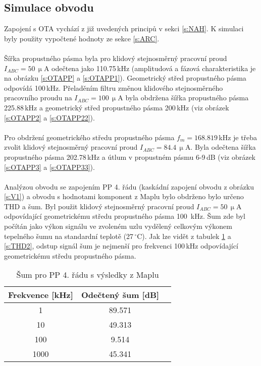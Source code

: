 \subsection{Simulace obvodu}
\noindent  Zapojení s OTA vychází z již uvedených principů v sekci \ref{s:NAH}. K simulaci byly použity vypočtené hodnoty ze sekce \ref{s:ARC}. \\
\\
Šířka propustného pásma byla pro klidový stejnosměrný pracovní proud $I_{ABC} = 50$\,$\upmu$A odečtena jako 110.75\,kHz (amplitudová a fázová charakteristika je na obrázku \ref{s:OTAPP} a \ref{s:OTAPP1}). Geometrický střed propustného pásma odpovídá 100\,kHz. Přeladěním filtru změnou klidového stejnosměrného pracovního proudu na $I_{ABC} = 100$\,$\upmu$A byla obdržena šířka propustného pásma 225.88\,kHz a geometrický střed propustného pásma 200\,kHz (viz obrázek \ref{s:OTAPP2} a \ref{s:OTAPP22}). \\
\\
Pro obdržení geometrického středu propustného pásma $f_m = 168.819$\,kHz je třeba zvolit klidový stejnosměrný pracovní proud $I_{ABC} = 84.4$\,$\upmu$A. Byla odečtena šířka propustného pásma 202.78\,kHz a útlum v propustném pásmu 6-9\,dB (viz obrázek \ref{s:OTAPP3} a \ref{s:OTAPP33}). \\
\\
Analýzou obvodu se zapojením PP 4. řádu (kaskádní zapojení obvodu z obrázku \ref{s:V1}) a obvodu s hodnotami komponent z Maplu bylo obdrženo bylo určeno THD a šum. Byl použit klidový stejnosměrný pracovní proud $I_{ABC} = 50$\,$\upmu$A odpovídající geometrickému středu propustného pásma 100~kHz. Šum zde byl počítán jako výkon signálu ve zvoleném uzlu vydělený celkovým výkonem tepelného šumu na standardní teplotě (27\,$^{\circ}$C). Jak lze vidět z tabulek \ref{s:THD1} a \ref{s:THD2}, odstup signál šum je nejmenší pro frekvenci 100\,kHz odpovídající geometrickému středu propustného pásma.
\begin{table}[h]
\centering
  \begin{tabular}{ | c | c | c |}
    \hline
     Frekvence [kHz] & Odečtený šum [dB] \\ \hline
    1 & 89.571 \\ \hline
    10 & 49.313 \\ \hline
    100 & 9.514 \\ \hline
    1000 & 45.341 \\ \hline
  \end{tabular}
  \caption[Šum pro PP 4. řádu (Maple)]{Šum pro PP 4. řádu s výsledky z Maplu \label{s:THD1}}
\end{table}
